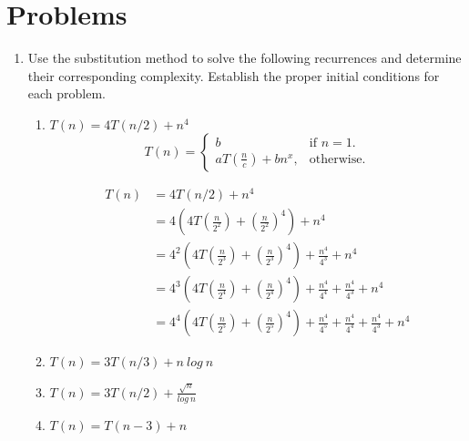 \documentclass{article}
\begin{document}
\section*{Problems}
\begin{enumerate}
    \item Use  the  substitution  method  to  solve  the  following  recurrences  and  determine  their  corresponding complexity. Establish the proper initial conditions for each problem.
    \begin{enumerate}
        \item $T(n) = 4T(n/2) + n^4$
        \begin{equation*}
            T(n)=\begin{cases}
              b & \text{if $n = 1$}.\\
              aT(\frac{n}{c}) + bn^x, & \text{otherwise}.
            \end{cases}
        \end{equation*}

        \begin{align*}
            T(n) &= 4 T(n/2) + n^4\\
            &= 4(4T(\frac{n}{2^2}) + (\frac{n}{2^2})^4) + n^4\\
            &= 4^2(4T(\frac{n}{2^3}) + (\frac{n}{2^3})^4 )+ \frac{n^4}{4^3} + n^4\\
            &= 4^3(4T(\frac{n}{2^4}) + (\frac{n}{2^4})^4)+ \frac{n^4}{4^4} + \frac{n^4}{4^3} + n^4\\
            &= 4^4(4T(\frac{n}{2^5}) + (\frac{n}{2^5})^4)+ \frac{n^4}{4^5} + \frac{n^4}{4^4} + \frac{n^4}{4^3} + n^4
        \end{align*}

        \item $T(n) = 3T(n/3) + n\ log\ n$
        \item $T(n) = 3T(n/2) + \frac{\sqrt{n}}{log\ n}$
        \item $T(n) = T(n - 3) + n$
    \end{enumerate}
\end{enumerate}
\end{document}
